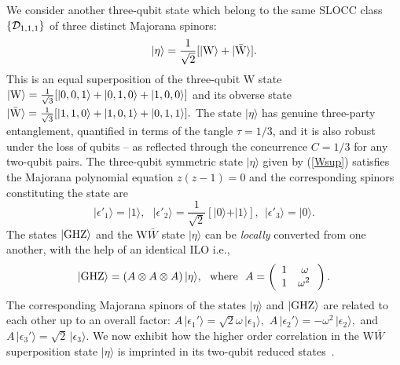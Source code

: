 \documentclass[pra,preprint,a4paper,superscriptaddress]{revtex4}
\newcommand{\be}{\begin{equation}}
\newcommand{\ee}{\end{equation}}
\begin{document}
{We  consider another three-qubit state which belong to the same SLOCC class $\{{\cal D}_{1,1,1}\}$ of three distinct Majorana spinors: 
\begin{equation}
\label{Wsup}
\vert \eta\rangle = \frac{1}{\sqrt{2}} [\vert {\rm W}\rangle +  \vert{\rm \bar{W}}\rangle]. 
\end{equation}         
This  is an equal superposition of the three-qubit W state $\vert{\rm W}\rangle=\frac{1}{\sqrt{3}}[\vert 0,0,1\rangle+\vert 0,1,0\rangle+\vert 1,0,0\rangle]$  
 and its obverse state 
$\vert{\rm \bar{W}}\rangle=\frac{1}{\sqrt{3}}[\vert 1,1,0\rangle+\vert 1,0,1\rangle+\vert 
0,1,1\rangle].$ 
The state $\vert \eta\rangle$ has genuine three-party entanglement, quantified in terms of the tangle 
$\tau=1/3$, and it is also robust under the loss of qubits -- as reflected through the concurrence $C=1/3$ for 
any two-qubit pairs.  The three-qubit symmetric state $\vert \eta\rangle$ given by (\ref{Wsup}) satisfies the Majorana polynomial 
equation $z(z-1)=0$  and the corresponding spinors constituting the state are 
\be
\vert \epsilon'_1\rangle =\vert 1\rangle,\ \ \  \vert \epsilon'_2\rangle =\frac{1}{\sqrt{2}}[\vert 0\rangle+ \vert 1\rangle], \ \  
\vert \epsilon'_3\rangle = \vert 0\rangle. 
\ee
 The states $\vert {\rm GHZ}\rangle$ and the W$\bar W$ 
state $\vert \eta\rangle$   can be {\em locally} converted from one another,  with the help of an identical ILO i.e.,
\be
\label{GHZ&eta}
\vert {\rm GHZ}\rangle=\left(A\otimes A\otimes A\right) \vert \eta\rangle,\ \   \mbox{where}\ \ 
A=\left(\begin{array}{cc} 1 & \omega \\ 1 & \omega^2\, \end{array}\right).
\ee
The corresponding Majorana spinors  of the states $\vert \eta\rangle$ and $\vert{\rm GHZ}\rangle$ are  related to each other 
up to an overall factor:   
$A\, \vert\epsilon_1'\rangle=\sqrt{2}\omega\, \vert\epsilon_1\rangle,$   
$A\, \vert\epsilon_2'\rangle=-\omega^2\, \vert\epsilon_2\rangle,$ 
and $A\, \vert\epsilon_3'\rangle=   \sqrt{2}\,  \vert\epsilon_3\rangle$.  
We now exhibit how the higher order correlation in  the W$\bar W$ superposition state $\vert \eta\rangle$ is imprinted in its two-qubit reduced states~\cite{SP1,usa,usa1,usa2}. 

}
\end{document}
